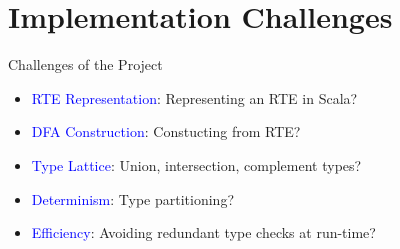 \section{Implementation Challenges}

{  %
\begin{frame}{Challenges of the Project}
  \begin{itemize}
  \item {} \textcolor{blue}{RTE Representation}:   Representing an RTE in Scala?
  \item {} \textcolor{blue}{DFA Construction}:  Constucting from RTE?
  \item {} \textcolor{blue}{Type Lattice}: Union, intersection, complement types?
  \item {} \textcolor{blue}{Determinism}: Type partitioning?
  \item {} \textcolor{blue}{Efficiency}:  Avoiding redundant type checks at run-time?
  \end{itemize}
\end{frame}
}

